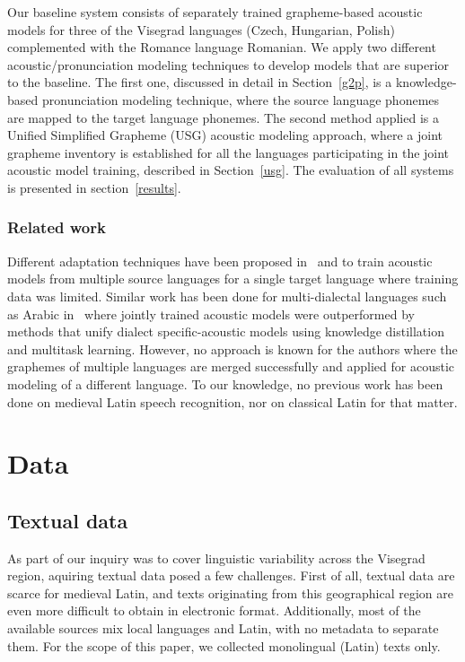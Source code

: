 \documentclass[runningheads,a4paper]{llncs}
\begin{document}
Our baseline system consists of separately trained grapheme-based acoustic models for three of the Visegrad languages (Czech, Hungarian, Polish) complemented with the Romance language Romanian.
We apply two different acoustic/pronunciation modeling techniques to develop models that are superior to the baseline.
The first one, discussed in detail in Section~\ref{g2p}, is a knowledge-based pronunciation modeling technique, where the source language phonemes are mapped to the target language phonemes.
The second method applied is a Unified Simplified Grapheme (USG) acoustic modeling approach, where a joint grapheme inventory is established for all the languages participating in the joint acoustic model training, described in Section~\ref{usg}.
The evaluation of all systems is presented in section~\ref{results}.

\subsubsection{Related work}
Different adaptation techniques have been proposed in~\cite{schultz01} and \cite{besacier14} to train acoustic models from multiple source languages for a single target language where training data was limited.
Similar work has been done for multi-dialectal languages such as Arabic in~\cite{elfeky16} where jointly trained acoustic models were outperformed by methods that unify dialect specific-acoustic models using knowledge distillation and multitask learning.
However, no approach is known for the authors where the graphemes of multiple languages are merged successfully and applied for acoustic modeling of a different language.
To our knowledge, no previous work has been done on medieval Latin speech recognition, nor on classical Latin for that matter.

\section{Data}
\subsection{Textual data}\label{text}
As part of our inquiry was to cover linguistic variability across the Visegrad region, aquiring textual data posed a few challenges.
First of all, textual data are scarce for medieval Latin, and texts originating from this geographical region are even more difficult to obtain in electronic format.
Additionally, most of the available sources mix local languages and Latin, with no metadata to separate them.
For the scope of this paper, we collected monolingual (Latin) texts only.
\end{document}
